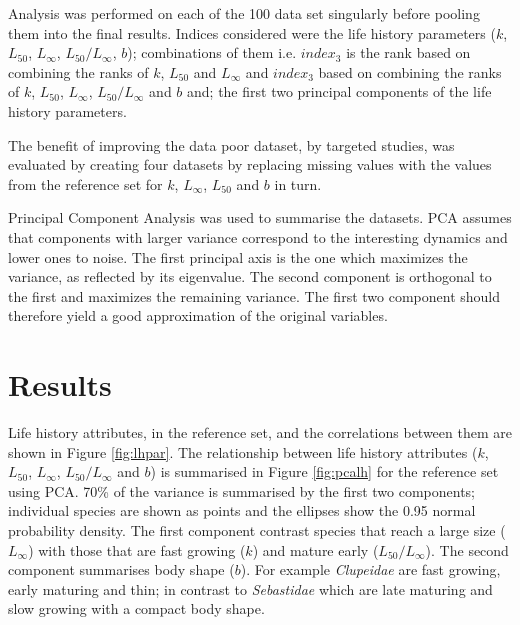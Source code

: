 \documentclass[12pt,doublespacing,a4paper]{ouparticle}
\begin{document}
Analysis was performed on each of the 100 data set singularly before pooling them into the final results. Indices considered were the life history parameters ($k$, $L_{50}$, $L_\infty$, $L_{50}/L_\infty$, $b$); combinations of them i.e. $index_{3}$ is the rank based on combining the ranks of $k$, $L_{50}$ and $L_\infty$ and $index_{3}$ based on combining the ranks of $k$, $L_{50}$, $L_\infty$, $L_{50}/L_\infty$ and $b$ and; the first two principal components of the life history parameters. 

The benefit of improving the data poor dataset, by targeted studies, was evaluated by creating four datasets by replacing missing values with the values from the reference set for $k$, $L_\infty$, $L_{50}$ and $b$ in turn.


Principal Component Analysis \citep[PCA,][]{dunteman1989principal} was used to summarise the datasets. PCA assumes that components with larger variance correspond to the interesting dynamics and lower ones to noise. The first principal axis is the one which maximizes the variance, as reflected by its eigenvalue. The second component is orthogonal to the first and maximizes the remaining variance. The first two component should therefore yield a good approximation of the original variables.


\section{Results}

Life history attributes, in the reference set, and the correlations between them are shown in Figure \ref{fig:lhpar}. The relationship between life history attributes ($k$, $L_{50}$, $L_\infty$, $L_{50}/L_\infty$ and $b$) is summarised in Figure \ref{fig:pcalh} for the reference set using PCA. 70\% of the variance is summarised by the first two components;  individual species are shown as points and the ellipses show the 0.95 normal probability density. The first component contrast species that reach a large size ($L_\infty$) with those that are fast growing ($k$) and mature early ($L_{50}/L_\infty$). The second component summarises body shape ($b$).  For example \textit{Clupeidae} are fast growing, early maturing and thin; in contrast to \textit{Sebastidae} which are late maturing and slow growing with a compact body shape. 
\end{document}
